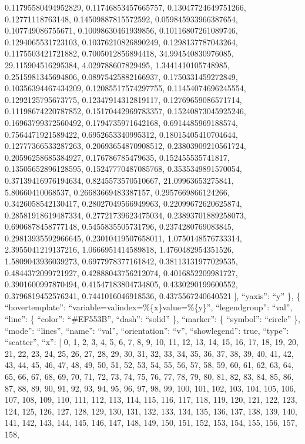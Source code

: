 \documentclass[
]{article}
\begin{document}
0.11795580494952829, 0.11746853457665757, 0.13047724649751266,
0.12771118763148, 0.14509887815572592, 0.059845933966387654,
0.107749086755671, 0.10098630461939856, 0.10116807261089746,
0.1294065531723103, 0.10376210826890249, 0.1298137787043264,
0.1175503421721882, 0.7005012856894418, 34.994540830976085,
29.115904516295384, 4.029788607829495, 1.3441410105748985,
0.2515981345694806, 0.08975425882166937, 0.1750331459272849,
0.10356394467434209, 0.12085517574297755, 0.11454074696245554,
0.1292125795673775, 0.12347914312819117, 0.12769659086571714,
0.11198674220787852, 0.15170442969783357, 0.15240873045925246,
0.16963799372560492, 0.1794735971642168, 0.6914485969188574,
0.7564471921589422, 0.6952653340995312, 0.18015405410704644,
0.12777366533287263, 0.20693654870908512, 0.23803909210561724,
0.20596258685384927, 0.176786785479635, 0.152455535741817,
0.13505652896128595, 0.15247770487085768, 0.3535349891570054,
0.37139416976194634, 0.8245573570510667, 21.09963653275841,
5.80660410068537, 0.26683669483387157, 0.2957669866124266,
0.3426058542130417, 0.28027049566949963, 0.22099672620625874,
0.28581918619487334, 0.27721739623475034, 0.23893701889258073,
0.6906878458777148, 0.5455835505731796, 0.2374280769083845,
0.29813935592966645, 0.23010419507658011, 1.0750148576733314,
2.3955041219137216, 1.0666951414589818, 1.4760482954351526,
1.5809043936039273, 0.6977978377161842, 0.38113131977029535,
0.4844372099721927, 0.42888043756212074, 0.4016852209981727,
0.3901600997870494, 0.41547183804734805, 0.4330290199600552,
0.3796819452576241, 0.7441016046918536, 0.4375567240640521 {]},
``yaxis'': ``y'' \}, \{ ``hovertemplate'':
``variable=valindex=\%\{x\}value=\%\{y\}'', ``legendgroup'': ``val'',
``line'': \{ ``color'': ``\#EF553B'', ``dash'': ``solid'' \},
``marker'': \{ ``symbol'': ``circle'' \}, ``mode'': ``lines'', ``name'':
``val'', ``orientation'': ``v'', ``showlegend'': true, ``type'':
``scatter'', ``x'': {[} 0, 1, 2, 3, 4, 5, 6, 7, 8, 9, 10, 11, 12, 13,
14, 15, 16, 17, 18, 19, 20, 21, 22, 23, 24, 25, 26, 27, 28, 29, 30, 31,
32, 33, 34, 35, 36, 37, 38, 39, 40, 41, 42, 43, 44, 45, 46, 47, 48, 49,
50, 51, 52, 53, 54, 55, 56, 57, 58, 59, 60, 61, 62, 63, 64, 65, 66, 67,
68, 69, 70, 71, 72, 73, 74, 75, 76, 77, 78, 79, 80, 81, 82, 83, 84, 85,
86, 87, 88, 89, 90, 91, 92, 93, 94, 95, 96, 97, 98, 99, 100, 101, 102,
103, 104, 105, 106, 107, 108, 109, 110, 111, 112, 113, 114, 115, 116,
117, 118, 119, 120, 121, 122, 123, 124, 125, 126, 127, 128, 129, 130,
131, 132, 133, 134, 135, 136, 137, 138, 139, 140, 141, 142, 143, 144,
145, 146, 147, 148, 149, 150, 151, 152, 153, 154, 155, 156, 157, 158,
\end{document}
